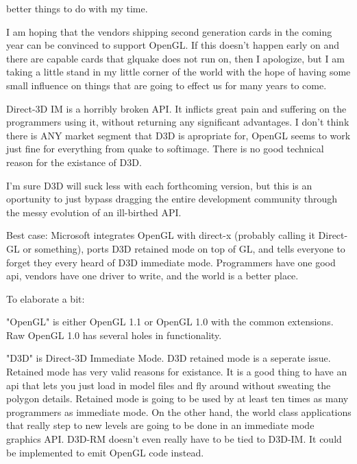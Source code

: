 \begin{allintypewriter}
better things to do with my time.\\ 
\par
I am hoping that the vendors shipping second generation cards in the coming 
year can be convinced to support OpenGL. If this doesn't happen early on and
there are capable cards that glquake does not run on, then I apologize, but I am
taking a little stand in my little corner of the world with the hope of having 
some small influence on things that are going to effect us for many years to come.\\ 
\par
Direct-3D IM is a horribly broken API. It inflicts great pain and suffering on 
the programmers using it, without returning any significant advantages. I don't 
think there is ANY market segment that D3D is apropriate for, OpenGL seems to work
just fine for everything from quake to softimage. There is no good technical reason
for the existance of D3D.\\ 
\par
I'm sure D3D will suck less with each forthcoming version, but this is an oportunity 
to just bypass dragging the entire development community through the messy evolution 
of an ill-birthed API.\\ 
\par
Best case: Microsoft integrates OpenGL with direct-x (probably calling it Direct-GL 
or something), ports D3D retained mode on top of GL, and tells everyone to forget 
they every heard of D3D immediate mode. Programmers have one good api, vendors have 
one driver to write, and the world is a better place.\\ 
\par
To elaborate a bit:\\ 
\par
"OpenGL" is either OpenGL 1.1 or OpenGL 1.0 with the common extensions. Raw OpenGL 1.0
has several holes in functionality.\\ 
\par
"D3D" is Direct-3D Immediate Mode. D3D retained mode is a seperate issue. Retained 
mode has very valid reasons for existance. It is a good thing to have an api that 
lets you just load in model files and fly around without sweating the polygon details. 
Retained mode is going to be used by at least ten times as many programmers as 
immediate mode. On the other hand, the world class applications that really step to new 
levels are going to be done in an immediate mode graphics API. D3D-RM doesn't even really 
have to be tied to D3D-IM. It could be implemented to emit OpenGL code instead.\\ 

\end{allintypewriter}
